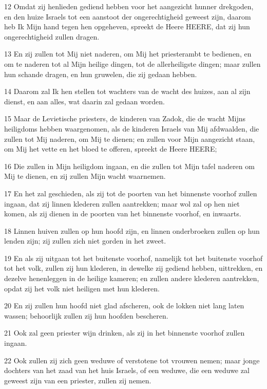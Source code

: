 \par 12 Omdat zij henlieden gediend hebben voor het aangezicht hunner drekgoden, en den huize Israels tot een aanstoot der ongerechtigheid geweest zijn, daarom heb Ik Mijn hand tegen hen opgeheven, spreekt de Heere HEERE, dat zij hun ongerechtigheid zullen dragen.
\par 13 En zij zullen tot Mij niet naderen, om Mij het priesterambt te bedienen, en om te naderen tot al Mijn heilige dingen, tot de allerheiligste dingen; maar zullen hun schande dragen, en hun gruwelen, die zij gedaan hebben.
\par 14 Daarom zal Ik hen stellen tot wachters van de wacht des huizes, aan al zijn dienst, en aan alles, wat daarin zal gedaan worden.
\par 15 Maar de Levietische priesters, de kinderen van Zadok, die de wacht Mijns heiligdoms hebben waargenomen, als de kinderen Israels van Mij afdwaalden, die zullen tot Mij naderen, om Mij te dienen; en zullen voor Mijn aangezicht staan, om Mij het vette en het bloed te offeren, spreekt de Heere HEERE;
\par 16 Die zullen in Mijn heiligdom ingaan, en die zullen tot Mijn tafel naderen om Mij te dienen, en zij zullen Mijn wacht waarnemen.
\par 17 En het zal geschieden, als zij tot de poorten van het binnenste voorhof zullen ingaan, dat zij linnen klederen zullen aantrekken; maar wol zal op hen niet komen, als zij dienen in de poorten van het binnenste voorhof, en inwaarts.
\par 18 Linnen huiven zullen op hun hoofd zijn, en linnen onderbroeken zullen op hun lenden zijn; zij zullen zich niet gorden in het zweet.
\par 19 En als zij uitgaan tot het buitenste voorhof, namelijk tot het buitenste voorhof tot het volk, zullen zij hun klederen, in dewelke zij gediend hebben, uittrekken, en dezelve henenleggen in de heilige kameren; en zullen andere klederen aantrekken, opdat zij het volk niet heiligen met hun klederen.
\par 20 En zij zullen hun hoofd niet glad afscheren, ook de lokken niet lang laten wassen; behoorlijk zullen zij hun hoofden bescheren.
\par 21 Ook zal geen priester wijn drinken, als zij in het binnenste voorhof zullen ingaan.
\par 22 Ook zullen zij zich geen weduwe of verstotene tot vrouwen nemen; maar jonge dochters van het zaad van het huis Israels, of een weduwe, die een weduwe zal geweest zijn van een priester, zullen zij nemen.
